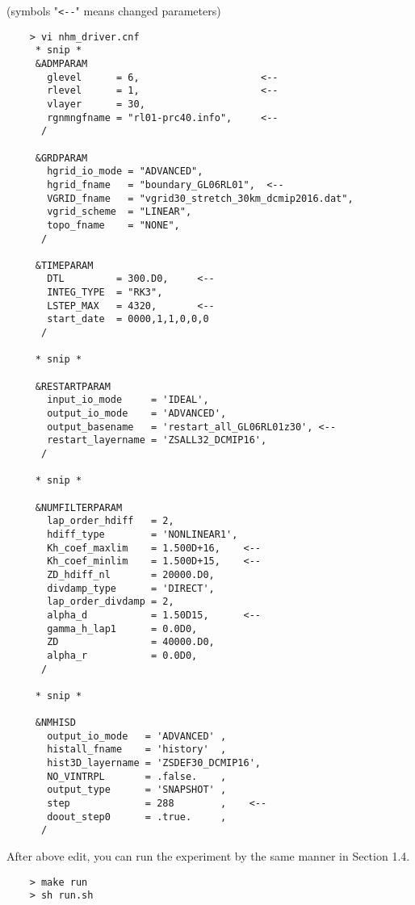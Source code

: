  \noindent (symbols "\verb|<--|" means changed parameters)
 \begin{verbatim}
    > vi nhm_driver.cnf
     * snip *
     &ADMPARAM
       glevel      = 6,                     <--
       rlevel      = 1,                     <--
       vlayer      = 30,
       rgnmngfname = "rl01-prc40.info",     <--
      /

     &GRDPARAM
       hgrid_io_mode = "ADVANCED",
       hgrid_fname   = "boundary_GL06RL01",  <--
       VGRID_fname   = "vgrid30_stretch_30km_dcmip2016.dat",
       vgrid_scheme  = "LINEAR",
       topo_fname    = "NONE",
      /

     &TIMEPARAM
       DTL         = 300.D0,     <--
       INTEG_TYPE  = "RK3",
       LSTEP_MAX   = 4320,       <--
       start_date  = 0000,1,1,0,0,0
      /

     * snip *

     &RESTARTPARAM
       input_io_mode     = 'IDEAL',
       output_io_mode    = 'ADVANCED',
       output_basename   = 'restart_all_GL06RL01z30', <--
       restart_layername = 'ZSALL32_DCMIP16',
      /

     * snip *

     &NUMFILTERPARAM
       lap_order_hdiff   = 2,
       hdiff_type        = 'NONLINEAR1',
       Kh_coef_maxlim    = 1.500D+16,    <--
       Kh_coef_minlim    = 1.500D+15,    <--
       ZD_hdiff_nl       = 20000.D0,
       divdamp_type      = 'DIRECT',
       lap_order_divdamp = 2,
       alpha_d           = 1.50D15,      <--
       gamma_h_lap1      = 0.0D0,
       ZD                = 40000.D0,
       alpha_r           = 0.0D0,
      /

     * snip *

     &NMHISD
       output_io_mode   = 'ADVANCED' ,
       histall_fname    = 'history'  ,
       hist3D_layername = 'ZSDEF30_DCMIP16',
       NO_VINTRPL       = .false.    ,
       output_type      = 'SNAPSHOT' ,
       step             = 288        ,    <--
       doout_step0      = .true.     ,
      /
 \end{verbatim}

 \noindent After above edit, you can run the experiment
 by the same manner in Section 1.4.
 \begin{verbatim}
    > make run
    > sh run.sh
 \end{verbatim}

